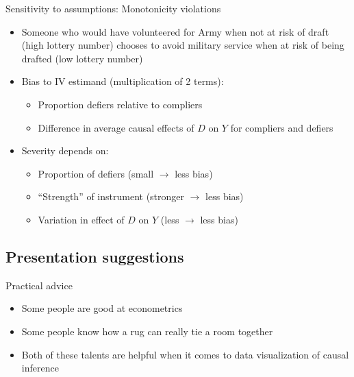 \documentclass{beamer}
\begin{document}
\begin{frame}{Sensitivity to assumptions: Monotonicity violations}

\begin{itemize}

\item Someone who would have volunteered for Army when not at risk of draft (high lottery number) chooses to avoid military service when at risk of being drafted (low lottery number)
	
\item Bias to IV estimand (multiplication of 2 terms):
		\begin{itemize}
		\item Proportion defiers relative to compliers
		\item Difference in average causal effects of $D$ on $Y$ for compliers and defiers
		\end{itemize}
\item Severity depends on:
		\begin{itemize}
		\item Proportion of defiers (small $\rightarrow$ less bias)
		\item ``Strength'' of instrument (stronger $\rightarrow$ less bias)
		\item Variation in effect of $D$ on $Y$ (less $\rightarrow$ less bias)
		\end{itemize}
\end{itemize}
		
\end{frame}

	
		

\subsection{Presentation suggestions}


\begin{frame}{Practical advice}

\begin{itemize}
\item Some people are good at econometrics
\item Some people know how a rug can really tie a room together
\item Both of these talents are helpful when it comes to data visualization of causal inference
\end{itemize}

\end{frame}
\end{document}
